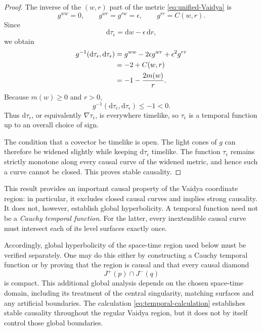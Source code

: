 \documentclass[11pt,a4paper]{article}
\theoremstyle{definition}
\theoremstyle{remark}
\newcommand{\dd}{\mathrm d}
\begin{document}
	\begin{proof}
		The inverse of the $(w,r)$ part of the metric
		\eqref{eq:unified-Vaidya} is
		\begin{equation}
			g^{ww}=0,
			\qquad
			g^{wr}=g^{rw}=\epsilon,
			\qquad
			g^{rr}=C(w,r).
		\end{equation}
		Since
		\[
		\dd\tau_\epsilon=\dd w-\epsilon\,\dd r,
		\]
		we obtain
		\begin{align}
			g^{-1}(\dd\tau_\epsilon,\dd\tau_\epsilon)
			&=
			g^{ww}
			-2\epsilon g^{wr}
			+\epsilon^2g^{rr}\notag\\
			&=
			-2+C(w,r)\notag\\
			&=
			-1-\frac{2m(w)}r.
			\label{eq:temporal-calculation}
		\end{align}
		Because $m(w)\geq0$ and $r>0$,
		\[
		g^{-1}(\dd\tau_\epsilon,\dd\tau_\epsilon)
		\leq-1<0.
		\]
		Thus $\dd\tau_\epsilon$, or equivalently
		$\nabla\tau_\epsilon$, is everywhere timelike, so
		$\tau_\epsilon$ is a temporal function up to an overall choice of sign.
		
		The condition that a covector be timelike is open.  The light cones of $g$
		can therefore be widened slightly while keeping
		$\dd\tau_\epsilon$ timelike.  The function $\tau_\epsilon$ remains strictly
		monotone along every causal curve of the widened metric, and hence such a
		curve cannot be closed.  This proves stable causality.
	\end{proof}
	
	This result provides an important causal property of the Vaidya coordinate
	region: in particular, it excludes closed causal curves and implies strong
	causality.  It does not, however, establish global hyperbolicity.  A temporal
	function need not be a \emph{Cauchy temporal function}.  For the latter, every
	inextendible causal curve must intersect each of its level surfaces exactly
	once.
	
	Accordingly, global hyperbolicity of the space-time region used below must be
	verified separately.  One may do this either by constructing a Cauchy
	temporal function or by proving that the region is causal and that every
	causal diamond
	\[
	J^+(p)\cap J^-(q)
	\]
	is compact.  This additional global analysis depends on the chosen
	space-time domain, including its treatment of the central singularity,
	matching surfaces and any artificial boundaries.  The calculation
	\eqref{eq:temporal-calculation} establishes stable causality throughout the
	regular Vaidya region, but it does not by itself control those global
	boundaries.
	
\end{document}
